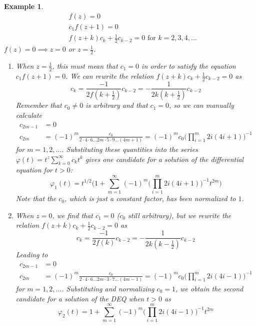 \documentclass{article}
\newtheorem{example}{Example}[section]
\theoremstyle{remark}
\theoremstyle{definition}
\begin{document}
\begin{example}
      \begin{align*}
          &f(z) = 0 \\
          &c_1 f(z+1) = 0 \\
          &f(z+k) c_k + \frac{1}{2} c_{k-2} = 0 \text{ for } k = 2, 3, 4, \ldots 
      \end{align*}
      $f(z) = 0 \implies z = 0$ or $z = \frac{1}{2}$. 
      \begin{enumerate}
          \item When $z = \frac{1}{2}$, this must mean that $c_1 = 0$ in order to satisfy the equation $c_1 f(z+1) = 0$. We can rewrite the relation $f(z+k) c_k + \frac{1}{2} c_{k-2} = 0$ as
          \[c_k = \frac{-1}{2 f(k + \frac{1}{2})} c_{k-2} = -\frac{1}{2k (k+\frac{1}{2})} c_{k-2}\]
          Remember that $c_0 \neq 0$ is arbitrary and that $c_1 = 0$, so we can manually calculate 
          \begin{align*}
              c_{2m-1} & = 0 \\
              c_{2m} & = (-1)^m \frac{c_0}{2 \cdot 4 \cdot 6 \ldots 2m \cdot 5 \cdot 9 \ldots (4m+1)} = (-1)^m c_0 \bigg( \prod_{i=1}^m 2i (4i + 1) \bigg)^{-1}
          \end{align*}
          for $m = 1, 2, \ldots $. Substituting these quantities into the series $\varphi(t) = t^z \sum_{k=0}^\infty c_k t^k$ gives
          one candidate for a solution of the differential equation for $t>0$:
          \[\varphi_1 (t) = t^{1/2} \Bigg( 1 + \sum_{m=1}^\infty (-1)^m \bigg( \prod_{i=1}^m 2i (4i + 1) \bigg)^{-1} t^{2m} \Bigg) \]
          Note that the $c_0$, which is just a constant factor, has been normalized to $1$. 
          \item When $z = 0$, we find that $c_1 = 0$ ($c_0$ still arbitrary), but we rewrite the relation $f(z+k) c_k + \frac{1}{2} c_{k-2} = 0$ as 
          \[c_k = \frac{-1}{2 f(k)} c_{k-2} = -\frac{1}{2k (k-\frac{1}{2})} c_{k-2}\]
          Leading to
          \begin{align*}
              c_{2m-1} & = 0 \\
              c_{2m} & = (-1)^m \frac{c_0}{2 \cdot 4 \cdot 6 \ldots 2m \cdot 3 \cdot 7 \ldots (4m-1)} = (-1)^m c_0 \bigg( \prod_{i=1}^m 2i (4i - 1) \bigg)^{-1}
          \end{align*}
          for $m = 1, 2, \ldots $. Substituting and normalizing $c_0 = 1$, we obtain the second candidate for a solution of the DEQ when $t>0$ as
          \[\varphi_2 (t) = 1 + \sum_{m=1}^\infty (-1)^m \bigg( \prod_{i=1}^m 2i (4i - 1) \bigg)^{-1} t^{2m}\]
      \end{enumerate}

\end{example}
\end{document}
